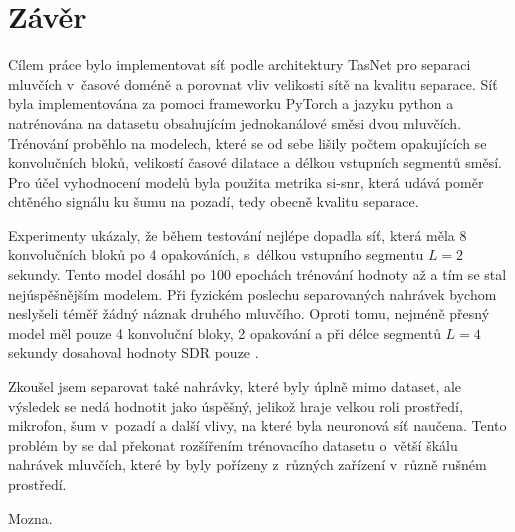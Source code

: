\chapter{Závěr}
\label{zaver}

Cílem práce bylo implementovat síť podle architektury TasNet pro separaci mluvčích v~časové doméně a porovnat vliv velikosti sítě na kvalitu separace. Síť byla implementována za pomoci frameworku PyTorch a jazyku python a natrénována na datasetu obsahujícím jednokanálové směsi dvou mluvčích. Trénování proběhlo na  modelech, které se od sebe lišily počtem opakujících se konvolučních bloků, velikostí časové dilatace a délkou vstupních segmentů směsí. Pro účel vyhodnocení modelů byla použita metrika si-snr, která udává poměr chtěného signálu ku šumu na pozadí, tedy obecně kvalitu separace. 

Experimenty ukázaly, že během testování nejlépe dopadla síť, která měla 8 konvolučních bloků po 4 opakováních, s~délkou vstupního segmentu $L=2$ sekundy. Tento model dosáhl po 100 epochách trénování hodnoty až  a tím se stal nejúspěšnějším modelem. Při fyzickém poslechu separovaných nahrávek bychom neslyšeli téměř žádný náznak druhého mluvčího. Oproti tomu, nejméně přesný model měl pouze 4 konvoluční bloky, 2 opakování a při délce segmentů $L=4$ sekundy dosahoval hodnoty SDR pouze .

Zkoušel jsem separovat také nahrávky, které byly úplně mimo dataset, ale výsledek se nedá hodnotit jako úspěšný, jelikož hraje velkou roli prostředí, mikrofon, šum v~pozadí a další vlivy, na které byla neuronová síť naučena. Tento problém by se dal překonat rozšířením trénovacího datasetu o~větší škálu nahrávek mluvčích, které by byly pořízeny z~různých zařízení v~různě rušném prostředí.

Mozna.


